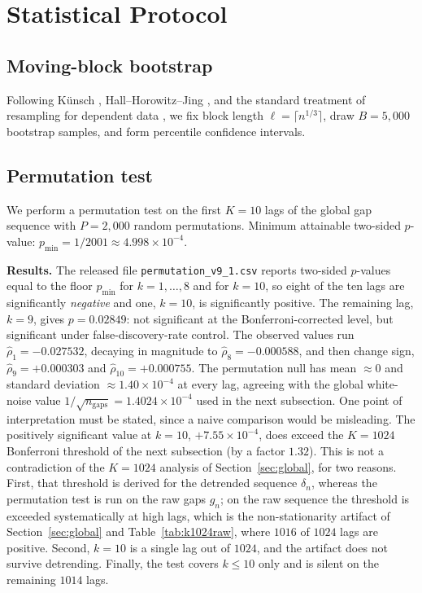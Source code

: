 \documentclass[11pt]{article}
\begin{document}
\section{Statistical Protocol}\label{sec:protocol}

\subsection{Moving-block bootstrap}
Following K\"unsch \cite{Kunsch1989}, Hall--Horowitz--Jing
\cite{HHJ1995}, and the standard treatment of resampling for
dependent data \cite{Lahiri2003}, we fix block length
$\ell = \lceil n^{1/3}\rceil$, draw
$B = 5{,}000$ bootstrap samples, and form percentile confidence
intervals.

\subsection{Permutation test}
We perform a permutation test on the first $K = 10$ lags of the global
gap sequence with $P = 2{,}000$ random permutations. Minimum attainable
two-sided $p$-value: $p_{\min} = 1/2001 \approx 4.998 \times 10^{-4}$.

\noindent\textbf{Results.} The released file
\texttt{permutation\_v9\_1.csv} reports two-sided $p$-values equal to
the floor $p_{\min}$ for $k = 1, \ldots, 8$ and for $k = 10$, so eight
of the ten lags are significantly \emph{negative} and one, $k = 10$, is
significantly positive. The remaining lag, $k = 9$, gives
$p = 0.02849$: not significant at the Bonferroni-corrected level, but
significant under false-discovery-rate control. The observed values run
$\hat\rho_1 = -0.027532$, decaying in magnitude to
$\hat\rho_8 = -0.000588$, and then change sign,
$\hat\rho_9 = +0.000303$ and $\hat\rho_{10} = +0.000755$. The
permutation null has mean $\approx 0$ and standard deviation
$\approx 1.40 \times 10^{-4}$ at every lag, agreeing with the global
white-noise value $1/\sqrt{n_{\text{gaps}}} = 1.4024 \times 10^{-4}$
used in the next subsection. One point of interpretation must be
stated, since a naive comparison would be misleading. The positively
significant value at $k = 10$, $+7.55 \times 10^{-4}$, does exceed the
$K = 1024$ Bonferroni threshold of the next subsection (by a factor
$1.32$). This is not a contradiction of the $K = 1024$ analysis of
Section~\ref{sec:global}, for two reasons. First, that threshold is
derived for the detrended sequence $\delta_n$, whereas the permutation
test is run on the raw gaps $g_n$; on the raw sequence the threshold is
exceeded systematically at high lags, which is the non-stationarity
artifact of Section~\ref{sec:global} and Table~\ref{tab:k1024raw},
where $1016$ of $1024$ lags are positive. Second, $k = 10$ is a
single lag out of $1024$, and the artifact does not survive
detrending. Finally, the test covers $k \leq 10$ only and is silent on
the remaining $1014$ lags.
\end{document}
